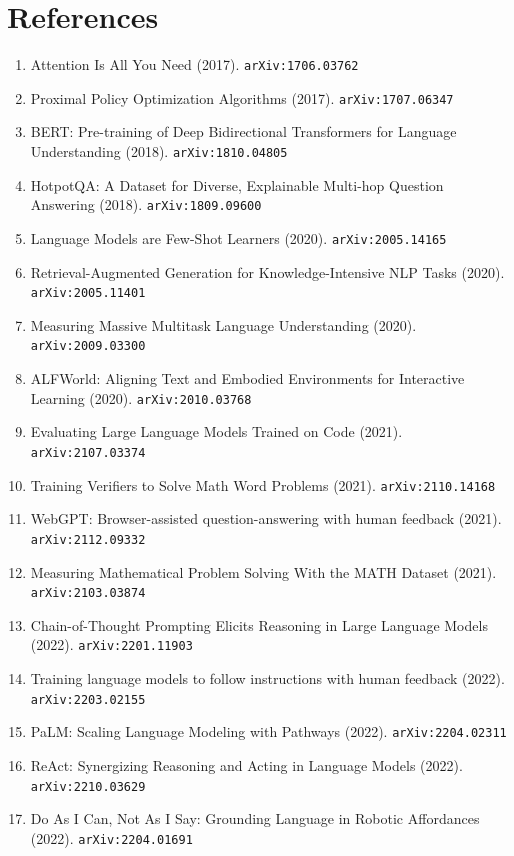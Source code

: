 \documentclass[11pt]{article}
\begin{document}
\section*{References}
\begin{enumerate}\small
  \item Attention Is All You Need (2017). \texttt{arXiv:1706.03762}
  \item Proximal Policy Optimization Algorithms (2017). \texttt{arXiv:1707.06347}
  \item BERT: Pre-training of Deep Bidirectional Transformers for Language
  Understanding (2018). \texttt{arXiv:1810.04805}
  \item HotpotQA: A Dataset for Diverse, Explainable Multi-hop Question
  Answering (2018). \texttt{arXiv:1809.09600}
  \item Language Models are Few-Shot Learners (2020). \texttt{arXiv:2005.14165}
  \item Retrieval-Augmented Generation for Knowledge-Intensive NLP Tasks (2020). \texttt{arXiv:2005.11401}
  \item Measuring Massive Multitask Language Understanding (2020). \texttt{arXiv:2009.03300}
  \item ALFWorld: Aligning Text and Embodied Environments for Interactive
  Learning (2020). \texttt{arXiv:2010.03768}
  \item Evaluating Large Language Models Trained on Code (2021). \texttt{arXiv:2107.03374}
  \item Training Verifiers to Solve Math Word Problems (2021). \texttt{arXiv:2110.14168}
  \item WebGPT: Browser-assisted question-answering with human feedback (2021). \texttt{arXiv:2112.09332}
  \item Measuring Mathematical Problem Solving With the MATH Dataset (2021). \texttt{arXiv:2103.03874}
  \item Chain-of-Thought Prompting Elicits Reasoning in Large Language Models (2022). \texttt{arXiv:2201.11903}
  \item Training language models to follow instructions with human feedback (2022). \texttt{arXiv:2203.02155}
  \item PaLM: Scaling Language Modeling with Pathways (2022). \texttt{arXiv:2204.02311}
  \item ReAct: Synergizing Reasoning and Acting in Language Models (2022). \texttt{arXiv:2210.03629}
  \item Do As I Can, Not As I Say: Grounding Language in Robotic Affordances (2022). \texttt{arXiv:2204.01691}

\end{enumerate}
\end{document}
